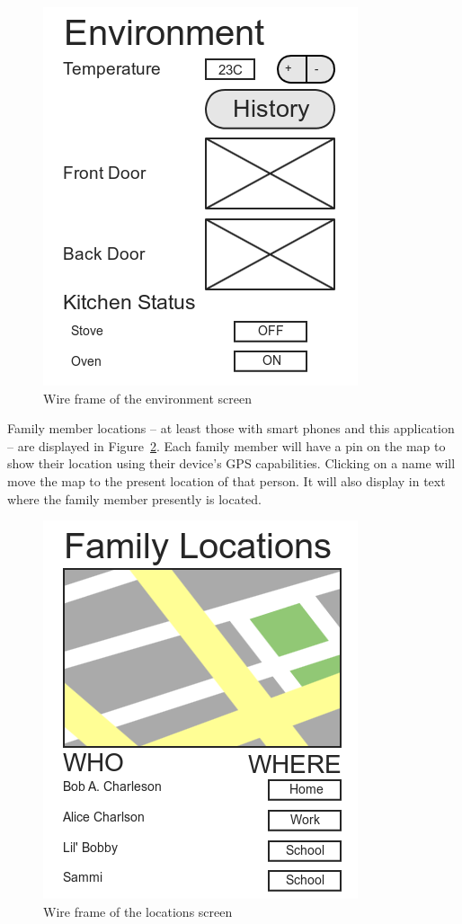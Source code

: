 \documentclass{report}
\begin{document}
\begin{figure}[H]
    \centering
    \includegraphics[scale=0.5]{mock_environment}
    \caption[Wire frame of the environment screen]
            {Wire frame of the environment screen}
    \label{fig:wireframe-environment}
\end{figure}

Family member locations -- at least those with smart phones and this
application -- are displayed in Figure~\ref{fig:wireframe-locations}. Each family
member will have a pin on the map to show their location using their device's
GPS capabilities. Clicking on a name will move the map to the present location
of that person. It will also display in text where the family member presently
is located.

\begin{figure}[H]
    \centering
    \includegraphics[scale=0.5]{mock_locations}
    \caption[Wire frame of the locations screen]
            {Wire frame of the locations screen}
    \label{fig:wireframe-locations}
\end{figure}
\end{document}
